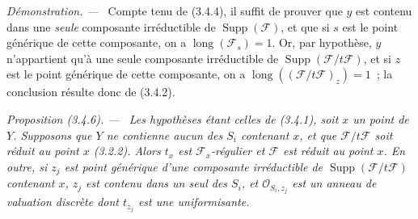 \documentclass[10pt,oneside]{book}
\newenvironment{proposition}[1][]{%
  \par\medskip\noindent\itshape Proposition (#1). ---\ }{\par}
\newenvironment{proof}{%
  \par\medskip\noindent\textit{Démonstration. ---\ }}{\par}
\begin{document}
\begin{proof}
Compte tenu de (3.4.4), il suffit de prouver que $y$ est contenu dans une
\emph{seule} composante irréductible de $\operatorname{Supp}(\mathcal F)$, et
que si $s$ est le point générique de cette composante, on a
$\operatorname{long}(\mathcal F_s)=1$. Or, par hypothèse, $y$ n'appartient
qu'à une seule composante irréductible de
$\operatorname{Supp}(\mathcal F/t\mathcal F)$, et si $z$ est le point
générique de cette composante, on a
$\operatorname{long}((\mathcal F/t\mathcal F)_z)=1$~; la conclusion résulte
donc de (3.4.2).
\end{proof}

\begin{proposition}[3.4.6]
\label{IV.2.3.4.6-fr}
Les hypothèses étant celles de (3.4.1), soit $x$ un point de $Y$. Supposons
que $Y$ ne contienne aucun des $S_i$ contenant $x$, et que
$\mathcal F/t\mathcal F$ soit réduit au point $x$ (3.2.2). Alors $t_x$ est
$\mathcal F_x$-régulier et $\mathcal F$ est réduit au point $x$. En outre, si
$z_j$ est point générique d'une composante irréductible de
$\operatorname{Supp}(\mathcal F/t\mathcal F)$ contenant $x$, $z_j$ est
contenu dans un seul des $S_i$, et $\mathcal O_{S_i,z_j}$ est un anneau de
valuation discrète dont $t_{z_j}$ est une uniformisante.
\end{proposition}
\end{document}
